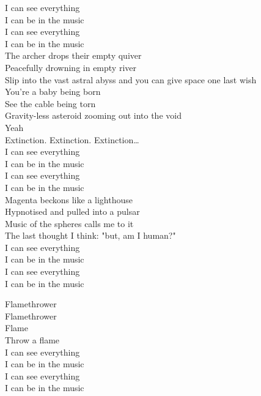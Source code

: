 I can see everything\\
I can be in the music\\
I can see everything\\
I can be in the music\\

The archer drops their empty quiver\\
Peacefully drowning in empty river\\
Slip into the vast astral abyss and you can give space one last wish\\

You're a baby being born\\
See the cable being torn\\
Gravity-less asteroid zooming out into the void\\
Yeah\\

Extinction. Extinction. Extinction…\\

I can see everything\\
I can be in the music\\
I can see everything\\
I can be in the music\\

Magenta beckons like a lighthouse\\
Hypnotised and pulled into a pulsar\\
Music of the spheres calls me to it\\
The last thought I think: "but, am I human?"\\

I can see everything\\
I can be in the music\\
I can see everything\\
I can be in the music\\


Flamethrower\\
Flamethrower\\
Flame\\
Throw a flame\\

I can see everything\\
I can be in the music\\
I can see everything\\
I can be in the music\\


